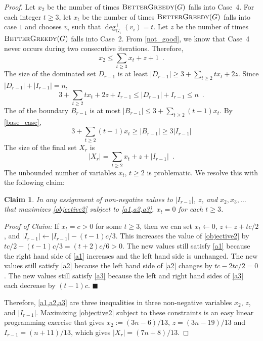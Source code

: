 \documentclass[12pt]{article}
\newtheorem{clm}{Claim}
\newenvironment{clmproof}{\noindent\emph{Proof of Claim:}}{\hfill$\blacksquare$\par}
\begin{document}
\begin{proof}
  Let $x_2$ be the number of times $\textsc{BetterGreedy}(G)$ falls into Case~4.
  For each integer $t\ge 3$, let $x_t$ be the number of times $\textsc{BetterGreedy}(G)$ falls into case $1$ and chooses $v_i$ such that $\deg^+_{G_i}(v_i)=t$.  Let $z$ be the number of times $\textsc{BetterGreedy}(G)$ falls into Case~2.  From \cref{not_good}, we know that Case~4 never occurs during two consecutive iterations.  Therefore,
  \begin{equation}
      x_2 \le \sum_{t\ge 3}x_t + z + 1 \enspace .  \label{a1}
  \end{equation}
  The size of the dominated set $D_{r-1}$ is at least $|D_{r-1}| \ge 3 + \sum_{t\ge 2}tx_t + 2z$.
  Since $|D_{r-1}|+|I_{r-1}|=n$,
  \begin{equation}
   3 + \sum_{t\ge 2}tx_t + 2z + I_{r-1} \le |D_{r-1}| + I_{r-1} \le n  \enspace . \label{a2}
  \end{equation}
  The of the boundary $B_{r-1}$ is at most $|B_{r-1}|\le 3+\sum_{t\ge 2}(t-1)x_t$.
  By \cref{base_case},
  \begin{equation}
    3+\sum_{t\ge 2}(t-1)x_t \ge |B_{r-1}| \ge 3|I_{r-1}| \label{a3}
  \end{equation}
  The size of the final set $X_{r}$ is
  \begin{equation}
    |X_r| = \sum_{t\ge 2}x_t + z + |I_{r-1}| \enspace . \label{objective2}
  \end{equation}
  The unbounded number of variables $x_t$, $t\ge 2$ is problematic. We resolve this with the following claim:
  \begin{clm}
    In any assignment of non-negative values to $|I_{r-1}|$, $z$, and $x_2,x_3,\ldots$ that maximizes \cref{objective2} subject to \cref{a1,a2,a3}, $x_t=0$ for each $t\ge 3$.
  \end{clm}
  \begin{clmproof}
     If $x_t = c >0$ for some $t\ge 3$, then we can set $x_t\gets 0$, $z\gets z+tc/2$, and $|I_{r-1}|\gets |I_{r-1}|-(t-1)c/3$.  This increases the value of \cref{objective2} by $tc/2-(t-1)c/3 =(t+2)c/6>0$.  The new values still satisfy \cref{a1} because the right hand side of \cref{a1} increases and the left hand side is unchanged.  The new values still satisfy \cref{a2} because the left hand side of \cref{a2} changes by $tc - 2tc/2 = 0$.  The new values still satisfy \cref{a3} because the left and right hand sides of \cref{a3} each decrease by $(t-1)c$.
  \end{clmproof}
  Therefore, \cref{a1,a2,a3} are three inequalities in three non-negative variables $x_2$, $z$, and $|I_{r-1}|$.  Maximizing \cref{objective2} subject to these constraints is an easy linear programming exercise that gives $x_2:=(3n-6)/13$, $z=(3n-19)/13$ and $I_{r-1}=(n+11)/13$, which gives $|X_r|= (7n+8)/13$.
\end{proof}
\end{document}
